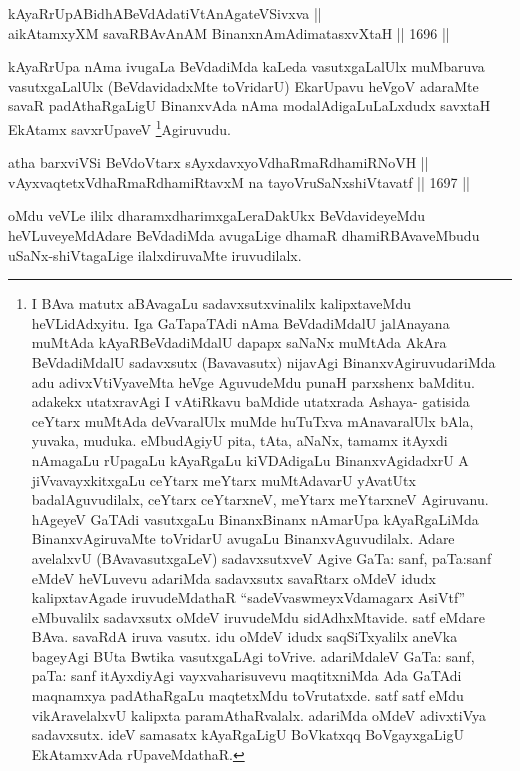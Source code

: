 \begin{shl}
kAyaRrUpABidhABeVdAdatiVtAnAgateVSivxva || \\
aikAtamxyXM savaRBAvAnAM BinanxnAmAdimatasxvXtaH \hfill || 1696 ||  
\end{shl}

\begin{artha}
kAyaRrUpa nAma ivugaLa BeVdadiMda kaLeda vasutxgaLalUlx muMbaruva vasutxgaLalUlx (BeVdavidadxMte toVridarU) EkarUpavu heVgoV adaraMte savaR padAthaRgaLigU BinanxvAda nAma modalAdigaLuLaLxdudx savxtaH EkAtamx savxrUpaveV \footnote{I BAva matutx aBAvagaLu sadavxsutxvinalilx kalipxtaveMdu heVLidAdxyitu. Iga GaTapaTAdi nAma BeVdadiMdalU jalAnayana muMtAda kAyaRBeVdadiMdalU dapapx saNaNx muMtAda AkAra BeVdadiMdalU sadavxsutx (Bavavasutx) nijavAgi BinanxvAgiruvudariMda adu adivxVtiVyaveMta heVge AguvudeMdu punaH parxshenx baMditu. adakekx utatxravAgi I vAtiRkavu baMdide utatxrada Ashaya- gatisida ceYtarx muMtAda deVvaralUlx muMde huTuTxva mAnavaralUlx bAla, yuvaka, muduka. eMbudAgiyU pita, tAta, aNaNx, tamamx itAyxdi nAmagaLu rUpagaLu kAyaRgaLu kiVDAdigaLu BinanxvAgidadxrU A jiVvavayxkitxgaLu ceYtarx meYtarx muMtAdavarU yAvatUtx badalAguvudilalx, ceYtarx ceYtarxneV, meYtarx meYtarxneV Agiruvanu. hAgeyeV GaTAdi vasutxgaLu BinanxBinanx nAmarUpa kAyaRgaLiMda BinanxvAgiruvaMte toVridarU avugaLu BinanxvAguvudilalx. Adare avelalxvU (BAvavasutxgaLeV) sadavxsutxveV Agive GaTa: sanf, paTa:sanf eMdeV heVLuvevu adariMda sadavxsutx savaRtarx oMdeV idudx kalipxtavAgade iruvudeMdathaR ``sadeVvaswmeyxVdamagarx AsiVtf'' eMbuvalilx sadavxsutx oMdeV iruvudeMdu sidAdhxMtavide. satf eMdare BAva. savaRdA iruva vasutx. idu oMdeV idudx saqSiTxyalilx aneVka bageyAgi BUta Bwtika vasutxgaLAgi toVrive. adariMdaleV GaTa: sanf, paTa: sanf itAyxdiyAgi vayxvaharisuvevu maqtitxniMda Ada GaTAdi maqnamxya padAthaRgaLu maqtetxMdu toVrutatxde. satf satf eMdu vikAravelalxvU kalipxta paramAthaRvalalx. adariMda oMdeV adivxtiVya sadavxsutx. ideV samasatx kAyaRgaLigU BoVkatxqq BoVgayxgaLigU EkAtamxvAda rUpaveMdathaR.}Agiruvudu.
\end{artha}

\begin{shl}
atha barxviVSi BeVdoV\s tarx sAyxdavxyoVdhaRmaRdhamiRNoVH || \\
vAyxvaqtetxVdhaRmaRdhamiRtavxM na tayoVruSaNxshiVtavatf \hfill || 1697 ||  
\end{shl}

\begin{artha}
oMdu veVLe ililx dharamxdharimxgaLeraDakUkx BeVdavideyeMdu heVLuveyeMdAdare BeVdadiMda avugaLige dhamaR dhamiRBAvaveMbudu uSaNx-shiVtagaLige ilalxdiruvaMte iruvudilalx.
\end{artha}

